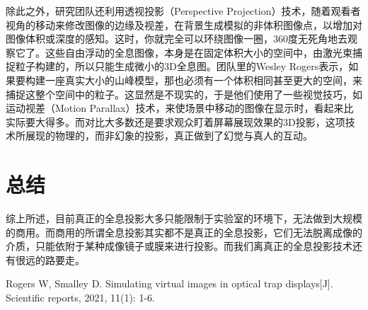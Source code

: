 \documentclass[UTF8]{ctexart}
\begin{document}
除此之外，研究团队还利用透视投影（Perspective Projection）技术，随着观看者视角的移动来修改图像的边缘及视差，在背景生成模拟的非体积图像点，以增加对图像体积或深度的感知。这时，你就完全可以环绕图像一圈，360度无死角地去观察它了。这些自由浮动的全息图像，本身是在固定体积大小的空间中，由激光束捕捉粒子构建的，所以只能生成微小的3D全息图。团队里的Wesley Rogers表示，如果要构建一座真实大小的山峰模型，那也必须有一个体积相同甚至更大的空间，来捕捉这整个空间中的粒子。这显然是不现实的，于是他们使用了一些视觉技巧，如运动视差（Motion Parallax）技术，来使场景中移动的图像在显示时，看起来比实际要大得多。而对比大多数还是要求观众盯着屏幕展现效果的3D投影，这项技术所展现的物理的，而非幻象的投影，真正做到了幻觉与真人的互动。


\section{总结}

综上所述，目前真正的全息投影大多只能限制于实验室的环境下，无法做到大规模的商用。而商用的所谓全息投影其实都不是真正的全息投影，它们无法脱离成像的介质，只能依附于某种成像镜子或膜来进行投影。而我们离真正的全息投影技术还有很远的路要走。

\begin{thebibliography}{99}  
Rogers W, Smalley D. Simulating virtual images in optical trap displays[J]. Scientific reports, 2021, 11(1): 1-6.
\end{thebibliography}
\end{document}
